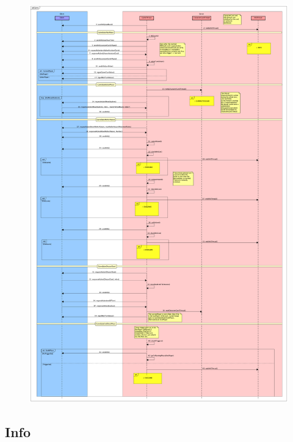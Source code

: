 \documentclass[12pt]{article}
\begin{document}
			\begin{figure}[htp]
				\centering
				\includegraphics[width=\textwidth,height=\textheight,keepaspectratio]{Game}
			\end{figure}
			
			\newpage
			
		\subsection{Info}
			
\end{document}
